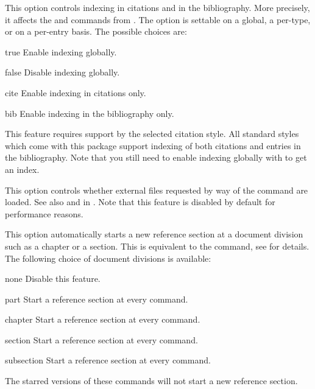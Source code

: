 \documentclass{ltxdockit}[2011/03/25]
\begin{document}
\begin{optionlist}
\begin{valuelist}
\end{valuelist}


This option controls indexing in citations and in the bibliography. More precisely, it affects the  and  commands from . The option is settable on a global, a per-type, or on a per-entry basis. The possible choices are:

\begin{valuelist}
\item[true] Enable indexing globally.
\item[false] Disable indexing globally.
\item[cite] Enable indexing in citations only.
\item[bib] Enable indexing in the bibliography only.
\end{valuelist}

This feature requires support by the selected citation style. All standard styles which come with this package support indexing of both citations and entries in the bibliography. Note that you still need to enable indexing globally with  to get an index.


This option controls whether external files requested by way of the  command are loaded. See also  and  in . Note that this feature is disabled by default for performance reasons.


This option automatically starts a new reference section at a document division such as a chapter or a section. This is equivalent to the  command, see  for details. The following choice of document divisions is available:

\begin{valuelist}
\item[none] Disable this feature.
\item[part] Start a reference section at every  command.
\item[chapter] Start a reference section at every  command.
\item[section] Start a reference section at every  command.
\item[subsection] Start a reference section at every  command.
\end{valuelist}
%
The starred versions of these commands will not start a new reference section.


\end{optionlist}
\end{document}
